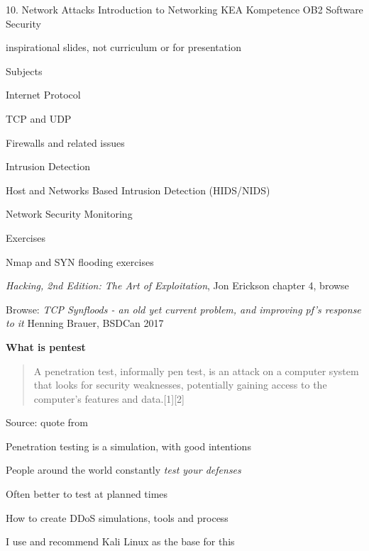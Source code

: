 \documentclass[Screen16to9,17pt]{foils}
\begin{document}
\mytitlepage
{10. Network Attacks Introduction to Networking}
{KEA Kompetence OB2 Software Security}

\centerline{\Large \color{red} inspirational slides, not curriculum or for presentation}



\begin{list1}
\item Subjects
\begin{list2}
\item Internet Protocol
\item TCP and UDP
\item Firewalls and related issues
\item Intrusion Detection
\item Host and Networks Based Intrusion Detection (HIDS/NIDS)
\item Network Security Monitoring
\end{list2}
\item Exercises
\begin{list2}
\item Nmap and SYN flooding exercises
\end{list2}
\end{list1}



\begin{list1}
\item \emph{Hacking, 2nd Edition: The Art of Exploitation}, Jon Erickson chapter 4, browse
\item Browse: \emph{TCP Synfloods - an old yet current problem, and improving pf's response to it}
Henning Brauer, BSDCan 2017 
\end{list1}




{\bf What is pentest}

\begin{quote}
A penetration test, informally pen test, is an attack on a computer system that looks for security weaknesses, potentially gaining access to the computer's features and data.[1][2]
\end{quote}
Source: quote from 

\begin{list1}
\item Penetration testing is a simulation, with good intentions
\item People around the world constantly \emph{test your defenses}
\item Often better to test at planned times
\item How to create DDoS simulations, tools and process
\item I use and recommend Kali Linux as the base for this
\end{list1}
\end{document}
